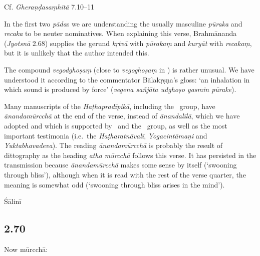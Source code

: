 \begin{ekdosis}
\begin{testimonia}[hp02_069]
Cf. \emph{Gheraṇḍasaṃhitā} 7.10--11

\begin{versinnote}
\end{versinnote}
\end{testimonia}

\begin{philcomm}[hp02_069]
In the first two \emph{pāda}s we are understanding the usually masculine \emph{pūraka} and \emph{recaka} to be neuter nominatives. When explaining this verse, Brahmānanda (\emph{Jyotsnā} 2.68) supplies the gerund \emph{kṛtvā} with \emph{pūrakaṃ} and \emph{kuryāt} with \emph{recakaṃ}, but it is unlikely that the author intended this. 

The compound \emph{vegodghoṣaṃ} (close to \emph{vegoghoṣaṃ} in \alphaOne) is rather unusual. We have understood it according to the commentator Bālakṛṣṇa’s gloss: `an inhalation in which sound is produced by force' (\emph{vegena sañjāta udghoṣo yasmin pūrake}). 

Many manuscripts of the \emph{Haṭhapradīpikā}, including the \textalpha\ group, have \emph{ānandamūrcchā} at the end of the verse, instead of \emph{ānandalīlā}, which we have adopted and which is supported by \betaTwo\ and the \textgamma\ group, as well as the most important testimonia (i.e.~the \emph{Haṭharatnāvalī}, \emph{Yogacintāmaṇi} and \emph{Yuktabhavadeva}). The reading \emph{ānanda\-mūrcchā} is probably the result of dittography as the heading \emph{atha mūrcchā} follows this verse. It has persisted in the transmission because  \emph{ānandamūrcchā} makes some sense by itself (`swooning through bliss'), although when it is read with the rest of the verse quarter, the meaning is somewhat odd (`swooning through bliss arises in the mind').
\end{philcomm}

\begin{metre}[hp02_069]
Śālinī 
\end{metre}

\subsection*{2.70}
\begin{translation}[hp02_070]
Now mūrcchā:


\end{translation}
\end{ekdosis}
